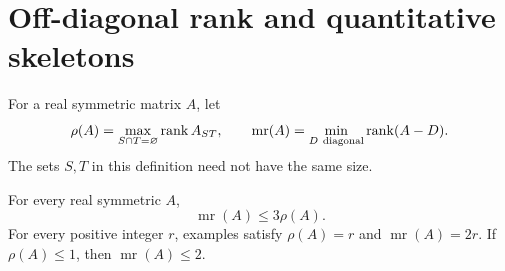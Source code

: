 \section{Off-diagonal rank and quantitative skeletons}
\label{sec:skeletons}

For a real symmetric matrix \(A\), let
\[
 \rho(A)=\max_{S\cap T=\varnothing}\operatorname{rank}A_{ST},
 \qquad
 \operatorname{mr}(A)=\min_{D\ {\rm diagonal}}\operatorname{rank}(A-D).
\]
The sets \(S,T\) in this definition need not have the same size.

\begin{theorem}
\label{thm:diagonal-completion}
For every real symmetric \(A\),
\[
 \operatorname{mr}(A)\leq3\rho(A).
\]
For every positive integer \(r\), examples satisfy
\(\rho(A)=r\) and \(\operatorname{mr}(A)=2r\).
If \(\rho(A)\leq1\), then \(\operatorname{mr}(A)\leq2\).
\end{theorem}
